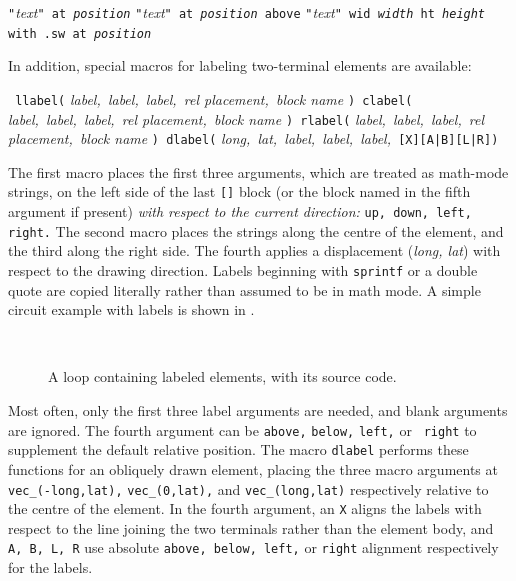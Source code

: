    {\tt "}{\sl text}{\tt" at {\sl position}}\NVL
   {\tt "}{\sl text}{\tt" at {\sl position} above}\NVL
   {\tt "}{\sl text}{\tt" wid {\sl width} ht {\sl height} 
     with .sw at {\sl position}}\NVL

   In addition, special macros for labeling two-terminal elements are available:
\par
{\tt
   llabel(} {\sl label,\ label,\ label,\ rel placement,\ block name} {\tt )
      \hfill\break\hspace*{\parindent}%
   clabel(} {\sl label,\ label,\ label,\ rel placement,\ block name} {\tt )
      \hfill\break\hspace*{\parindent}%
   rlabel(} {\sl label,\ label,\ label,\ rel placement,\ block name} {\tt )
      \hfill\break\hspace*{\parindent}%
   dlabel(} {\sl long,\ lat,\ label,\ label,\ label,\ }{\tt[X][A|B][L|R])}

The first macro places the first three arguments, which are treated
as math-mode strings, on the left side of the last {\tt []} block (or
the block named in the fifth argument if present) {\em with respect to
the current direction:} {\tt up, down, left, right.} The second macro
places the strings along the centre of the element, and the third along
the right side.  The fourth applies a displacement ({\sl long, lat}) with
respect to the drawing direction.  Labels beginning with {\tt sprintf}
or a double quote are copied literally rather than assumed to be in
math mode.  A simple circuit example with labels is shown in .
\begin{figure}[H]
   \vspace*{-\baselineskip}
   \parbox{4in}{\small }%
   \hfill\raise-0.5in\hbox{ }
   \vspace*{-\baselineskip}
   \caption{A loop containing labeled elements, with its source code.}
   \label{Loop}
   \end{figure}
Most often, only
the first three label arguments are needed, and blank arguments are ignored.
The fourth argument can be {\tt above,} {\tt below,} {\tt left,} or {\tt
right} to supplement the default relative position.
The macro {\tt dlabel} performs these functions for an
obliquely drawn element, placing the three macro arguments at
{\tt vec\_(-long,lat),} {\tt vec\_(0,lat),} and {\tt vec\_(long,lat)}
respectively relative to the centre of the element.
In the fourth argument, an {\tt X} aligns the labels with respect to the line
joining the two terminals rather than the element body, and
{\tt A, B, L, R} use absolute {\tt above, below, left,} or {\tt right} alignment
respectively for the labels.

